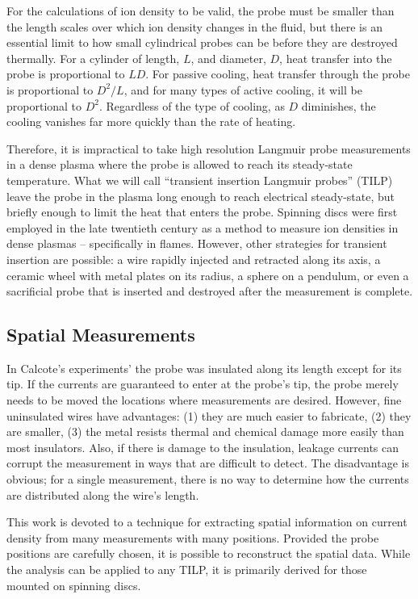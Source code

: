 \documentclass{article}
\begin{document}
For the calculations of ion density to be valid, the probe must be smaller than the length scales over which ion density changes in the fluid, but there is an essential limit to how small cylindrical probes can be before they are destroyed thermally.  For a cylinder of length, $L$, and diameter, $D$, heat transfer into the probe is proportional to $LD$.  For passive cooling, heat transfer through the probe is proportional to $D^2/L$, and for many types of active cooling, it will be proportional to $D^2$.  Regardless of the type of cooling, as $D$ diminishes, the cooling vanishes far more quickly than the rate of heating.  

Therefore, it is impractical to take high resolution Langmuir probe measurements in a dense plasma where the probe is allowed to reach its steady-state temperature.  What we will call ``transient insertion Langmuir probes'' (TILP) leave the probe in the plasma long enough to reach electrical steady-state, but briefly enough to limit the heat that enters the probe.  Spinning discs were first employed in the late twentieth century as a method to measure ion densities in dense plasmas -- specifically in flames.  However, other strategies for transient insertion are possible: a wire rapidly injected and retracted along its axis, a ceramic wheel with metal plates on its radius, a sphere on a pendulum, or even a sacrificial probe that is inserted and destroyed after the measurement is complete.

\subsection{Spatial Measurements}

In Calcote's experiments' the probe was insulated along its length except for its tip.  If the currents are guaranteed to enter at the probe's tip, the probe merely needs to be moved the locations where measurements are desired.  However, fine uninsulated wires have advantages: (1) they are much easier to fabricate, (2) they are smaller, (3) the metal resists thermal and chemical damage more easily than most insulators.  Also, if there is damage to the insulation, leakage currents can corrupt the measurement in ways that are difficult to detect.  The disadvantage is obvious; for a single measurement, there is no way to determine how the currents are distributed along the wire's length.

This work is devoted to a technique for extracting spatial information on current density from many measurements with many positions.  Provided the probe positions are carefully chosen, it is possible to reconstruct the spatial data.  While the analysis can be applied to any TILP, it is primarily derived for those mounted on spinning discs.
\end{document}

